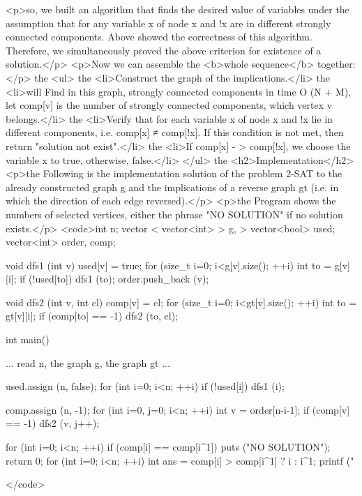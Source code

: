 <p>so, we built an algorithm that finds the desired value of variables under the assumption that for any variable x of node x and !x are in different strongly connected components. Above showed the correctness of this algorithm. Therefore, we simultaneously proved the above criterion for existence of a solution.</p>
<p>Now we can assemble the <b>whole sequence</b> together:</p>
the <ul>
the <li>Construct the graph of the implications.</li>
the <li>will Find in this graph, strongly connected components in time O (N + M), let comp[v] is the number of strongly connected components, which vertex v belongs.</li>
the <li>Verify that for each variable x of node x and !x lie in different components, i.e. comp[x] ≠ comp[!x]. If this condition is not met, then return "solution not exist".</li>
the <li>If comp[x] - > comp[!x], we choose the variable x to true, otherwise, false.</li>
</ul>
the <h2>Implementation</h2>
<p>the Following is the implementation solution of the problem 2-SAT to the already constructed graph g and the implications of a reverse graph gt (i.e. in which the direction of each edge reversed).</p>
<p>the Program shows the numbers of selected vertices, either the phrase "NO SOLUTION" if no solution exists.</p>
<code>int n;
vector < vector<int> > g, > 
vector<bool> used;
vector<int> order, comp;

void dfs1 (int v) {
used[v] = true;
for (size_t i=0; i<g[v].size(); ++i) {
int to = g[v][i];
if (!used[to])
dfs1 (to);
}
order.push_back (v);
}

void dfs2 (int v, int cl) {
comp[v] = cl;
for (size_t i=0; i<gt[v].size(); ++i) {
int to = gt[v][i];
if (comp[to] == -1)
dfs2 (to, cl);
}
}

int main() {
... read n, the graph g, the graph gt ...

used.assign (n, false);
for (int i=0; i<n; ++i)
if (!used[i])
dfs1 (i);

comp.assign (n, -1);
for (int i=0, j=0; i<n; ++i) {
int v = order[n-i-1];
if (comp[v] == -1)
dfs2 (v, j++);
}

for (int i=0; i<n; ++i)
if (comp[i] == comp[i^1]) {
puts ("NO SOLUTION");
return 0;
}
for (int i=0; i<n; ++i) {
int ans = comp[i] > comp[i^1] ? i : i^1;
printf ("%
}

}</code>